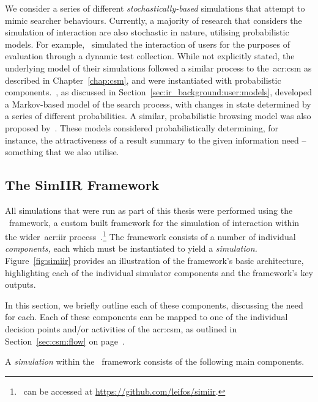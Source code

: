  We consider a series of different \emph{stochastically-based} simulations that attempt to mimic searcher behaviours. Currently, a majority of research that considers the simulation of interaction are also stochastic in nature, utilising probabilistic models. For example,~\cite{carterette2011effectiveness_evaluation} simulated the interaction of users for the purposes of evaluation through a dynamic test collection. While not explicitly stated, the underlying model of their simulations followed a similar process to the~\gls{acr:csm} as described in Chapter~\ref{chap:csm}, and were instantiated with probabilistic components.~\cite{baskaya2013behavioural_factors}, as discussed in Section~\ref{sec:ir_background:user:models}, developed a Markov-based model of the search process, with changes in state determined by a series of different probabilities. A similar, probabilistic browsing model was also proposed by~\cite{yilmaz2010browsing_utility}. These models considered probabilistically determining, for instance, the attractiveness of a result summary to the given information need -- something that we also utilise. 

\subsection{The SimIIR Framework}\label{sec:method:simulation:simiir}
All simulations that were run as part of this thesis were performed using the \simiir~framework, a custom built framework for the simulation of interaction within the wider~\gls{acr:iir} process~\citep{maxwell2016simiir}.\footnote{\simiir~can be accessed at \url{https://github.com/leifos/simiir}. } The framework consists of a number of individual \emph{components,} each which must be instantiated to yield a \emph{simulation.} Figure~\ref{fig:simiir} provides an illustration of the framework's basic architecture, highlighting each of the individual simulator components and the framework's key outputs.

In this section, we briefly outline each of these components, discussing the need for each. Each of these components can be mapped to one of the individual decision points and/or activities of the \gls{acr:csm}, as outlined in Section~\ref{sec:csm:flow} on page~\pageref{sec:csm:flow}.

A \emph{simulation} within the \simiir~framework consists of the following main components.

